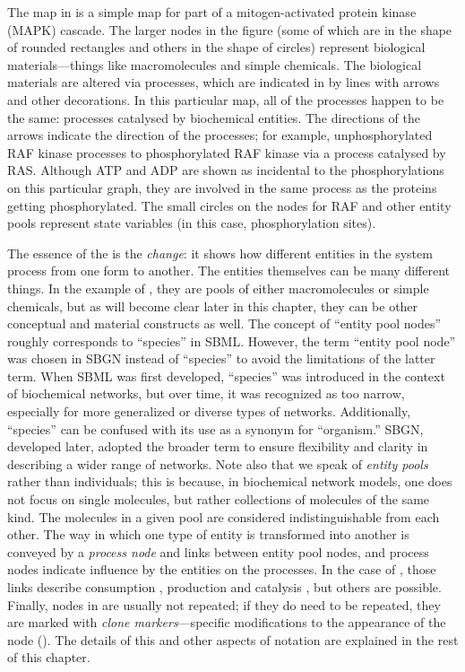 The map in  is a simple map for part of a mitogen-activated protein kinase (MAPK) cascade.  The larger nodes in the figure (some of which are in the shape of rounded rectangles and others in the shape of circles) represent biological materials---things like macromolecules and simple chemicals.  The biological materials are altered via processes, which are indicated in \PDl by lines with arrows and other decorations.  In this particular map, all of the processes happen to be the same: processes catalysed by biochemical entities.  The directions of the arrows indicate the direction of the processes; for example, unphosphorylated RAF kinase processes to phosphorylated RAF kinase via a process catalysed by RAS. Although ATP and ADP are shown as incidental to the phosphorylations on this particular graph, they are involved in the same process as the proteins getting phosphorylated. The small circles on the nodes for RAF and other entity pools represent state variables (in this case, phosphorylation sites). 

The essence of the \PDs is the \emph{change}: it shows how different entities in the system process from one form to another.  The entities themselves can be many different things.  In the example of , they are pools of either macromolecules or simple chemicals, but as will become clear later in this chapter, they can be other conceptual and material constructs as well. The concept of ``entity pool nodes'' roughly corresponds to ``species'' in SBML. However, the term ``entity pool node'' was chosen in SBGN instead of ``species'' to avoid the limitations of the latter term. When SBML was first developed, ``species'' was introduced in the context of biochemical networks, but over time, it was recognized as too narrow, especially for more generalized or diverse types of networks. Additionally, ``species'' can be confused with its use as a synonym for ``organism.'' SBGN, developed later, adopted the broader term to ensure flexibility and clarity in describing a wider range of networks. Note also that we speak of \emph{entity pools} rather than individuals; this is because, in biochemical network models, one does not focus on single molecules, but rather collections of molecules of the same kind.  The molecules in a given pool are considered indistinguishable from each other.  The way in which one type of entity is transformed into another is conveyed by a \emph{process node} and links between entity pool nodes, and process nodes indicate influence by the entities on the processes.  In the case of , those links describe consumption , production  and catalysis , but others are possible.  Finally, nodes in \PDs are usually not repeated; if they do need to be repeated, they are marked with \emph{clone markers}---specific modifications to the appearance of the node (). The details of this and other aspects of \PD notation are explained in the rest of this chapter.

